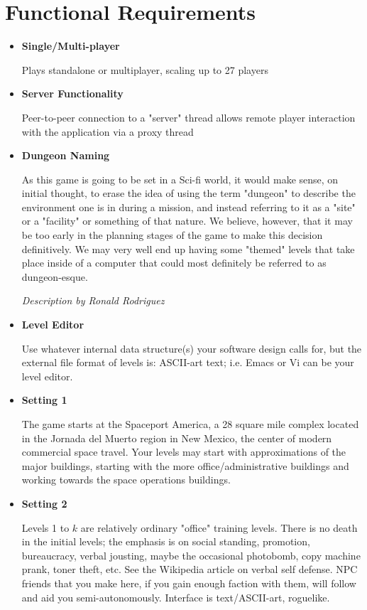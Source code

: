 \documentclass[12pt]{article}
\begin{document}
\section{Functional Requirements}
\begin{itemize}
	\item \textbf{Single/Multi-player}
	
	Plays standalone or multiplayer, scaling up to 27 players
	
	\item \textbf{Server Functionality}
	
	Peer-to-peer connection to a "server" thread allows remote player
	interaction with the application via a proxy thread
	
	\item \textbf{Dungeon Naming} 
	
	As this game is going to be set in a Sci-fi world, it would make sense, on 
	initial thought, to erase the idea of using the term "dungeon" to describe 
	the environment one is in during a mission, and instead referring to it as 
	a "site" or a "facility" or something of that nature. We believe, however, 
	that it may be too early in the planning stages of the game to make this 
	decision definitively. We may very well end up having some "themed" levels 
	that take place inside of a computer that could most definitely be referred 
	to as dungeon-esque. 
	
	\emph{Description by Ronald Rodriguez}
	
	\item \textbf{Level Editor}
	
	Use whatever internal data structure(s) your software design calls
	for, but the external file format of levels is: ASCII-art text; i.e.
	Emacs or Vi can be your level editor.
	
	\item \textbf{Setting 1}
	
	The game starts at the Spaceport America, a 28 square mile
	complex located in the Jornada del Muerto region in New Mexico, the
	center of modern commercial space travel. Your levels may
	start with approximations of the major buildings, starting with the more
	office/administrative buildings and working towards the space operations
	buildings.
	
	\item \textbf{Setting 2}
	
	Levels 1 to $k$ are relatively ordinary "office" training levels. There is
	no death in the initial levels; the emphasis is on social standing,
	promotion, bureaucracy, verbal jousting, maybe the occasional photobomb,
	copy machine prank, toner theft, etc. See the Wikipedia article on
	verbal self defense. NPC friends that you make here, if you gain enough
	faction with them, will follow and aid you semi-autonomously. Interface
	is text/ASCII-art, roguelike. 
	

\end{itemize}
\end{document}
